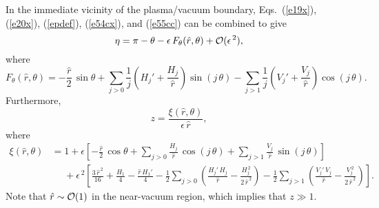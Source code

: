 \documentclass[12pt,prb,aps]{revtex4-1}
\begin{document}
In the immediate vicinity of the plasma/vacuum boundary, Eqs.~(\ref{e19x}), (\ref{e20x}), (\ref{epdef}), (\ref{e54cx}), and (\ref{e55cc}) can
be combined to give\,\cite{fitz2024}
\begin{equation}\label{e73h}
\eta=\pi-\theta-\epsilon\,F_\theta(\hat{r},\theta)+{\cal O}(\epsilon^{\,2}),
\end{equation}
where
\begin{equation}\label{e234}
F_\theta(\hat{r},\theta) = -\frac{\hat{r}}{2}\,\sin\theta+\sum_{j>0}\frac{1}{j}\left(H_j' + \frac{H_j}{\hat{r}}\right)\sin(j\,\theta)
-\sum_{j>1}\frac{1}{j}\left(V_j' + \frac{V_j}{\hat{r}}\right)\cos(j\,\theta).
\end{equation}
Furthermore, 
\begin{equation}\label{e74cc}
z = \frac{\xi(\hat{r},\theta)}{\epsilon\,\hat{r}},
\end{equation}
where 
\begin{align}\label{e75cc}
\xi(\hat{r},\theta)&= 1+ \epsilon\left[-\frac{\hat{r}}{2}\,\cos\theta
 +\sum_{j>0}\frac{H_j}{\hat{r}}\,\cos(j\,\theta)+\sum_{j>1}\frac{V_j}{\hat{r}}\,\sin(j\,\theta)\right] \\[0.5ex]
 &\phantom{=}+ \epsilon^{\,2}\left[\frac{3\,\hat{r}^{\,2}}{16}+\frac{H_1}{4}-\frac{\hat{r}\,H_1'}{4}
-\frac{1}{2}\sum_{j>0}\left(\frac{H_j'\,H_j}{\hat{r}}-\frac{H_j^{\,2}}{2\,\hat{r}^{\,2}}\right)-\frac{1}{2}\sum_{j>1}\left(\frac{V_j'\,V_j}{\hat{r}}-\frac{V_j^{\,2}}{2\,\hat{r}^{\,2}}\right)\right].\nonumber
\end{align}
Note that  $\hat{r}\sim{\cal O}(1)$ in the near-vacuum region, which implies that $z\gg 1$. 
\end{document}

